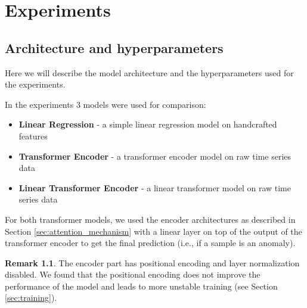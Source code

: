 \documentclass[a4paper, twoside]{report}
\theoremstyle{definition}
\newtheorem{remark}[theorem]{Remark}
\numberwithin{equation}{section}
\begin{document}







\chapter{Experiments}


\section{Architecture and hyperparameters} \label{sec:architecture}


Here we will describe the model architecture and the hyperparameters used for the experiments.

In the experiments 3 models were used for comparison:
\begin{itemize}
    \item \textbf{Linear Regression} - a simple linear regression model on handcrafted features
    \item \textbf{Transformer Encoder} - a transformer encoder model on raw time series data
    \item \textbf{Linear Transformer Encoder} - a linear transformer model on raw time series data
\end{itemize}

For both transformer models, we used the encoder architectures as described in Section \ref{sec:attention_mechanism}
with a linear layer on top of the output of the transformer encoder to get the final prediction (i.e., if a sample is an anomaly).
\begin{remark}
    The encoder part has positional encoding and layer normalization disabled.
    We found that the positional encoding does not improve the performance of the model and leads to more
    unstable training (see Section \ref{sec:training}).
\end{remark}
\end{document}
